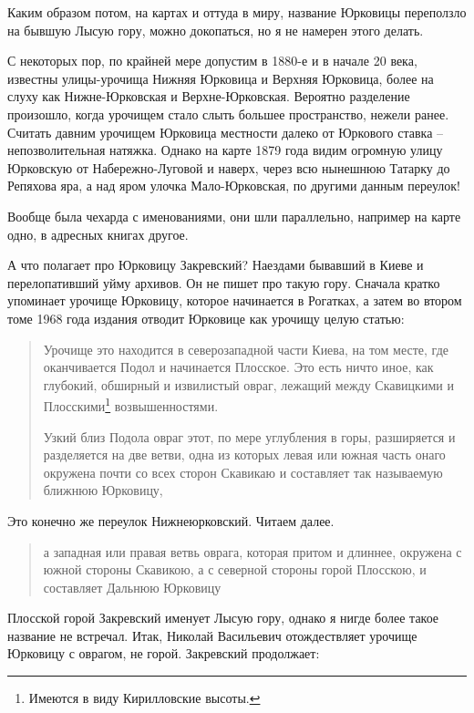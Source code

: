 Каким образом потом, на картах и оттуда в миру, название Юрковицы переползло на бывшую Лысую гору, можно докопаться, но я не намерен этого делать.

С некоторых пор, по крайней мере допустим в 1880-е и в начале 20 века, известны улицы-урочища Нижняя Юрковица и Верхняя Юрковица, более на слуху как Нижне-Юрковская и Верхне-Юрковская. Вероятно разделение произошло, когда урочищем стало слыть большее пространство, нежели ранее. Считать давним урочищем Юрковица местности далеко от Юркового ставка – непозволительная натяжка. Однако на карте 1879 года видим огромную улицу Юрковскую от Набережно-Луговой и наверх, через всю нынешнюю Татарку до Репяхова яра, а над яром улочка Мало-Юрковская, по другими данным переулок! 

Вообще была чехарда с именованиями, они шли параллельно, например на карте одно, в адресных книгах другое.

А что полагает про Юрковицу Закревский? Наездами бывавший в Киеве и перелопативший уйму архивов. Он не пишет про такую гору.  Сначала кратко упоминает урочище Юрковицу, которое начинается в Рогатках, а затем во втором томе 1968 года издания отводит Юрковице как урочищу целую статью:

\begin{quotation}
Урочище это находится в северозападной части Киева, на том месте, где оканчивается Подол и начинается Плосское. Это есть ничто иное, как глубокий, обширный и извилистый овраг, лежащий между Скавицкими и Плосскими\footnote{Имеются в виду Кирилловские высоты.} возвышенностями. 

Узкий близ Подола овраг этот, по мере углубления в горы, разширяется и разделяется на две ветви, одна из которых левая или южная часть онаго окружена почти со всех сторон Скавикаю и составляет так называемую ближнюю Юрковицу, 
\end{quotation}

Это конечно же переулок Нижнеюрковский. Читаем далее.

\begin{quotation}
а западная или правая ветвь оврага, которая притом и длиннее, окружена с южной стороны Скавикою, а с северной стороны горой Плосскою, и составляет Дальнюю Юрковицу
\end{quotation}

Плосской горой Закревский именует Лысую гору, однако я нигде более такое название не встречал. Итак, Николай Васильевич отождествляет урочище Юрковицу с оврагом, не горой. Закревский продолжает:

